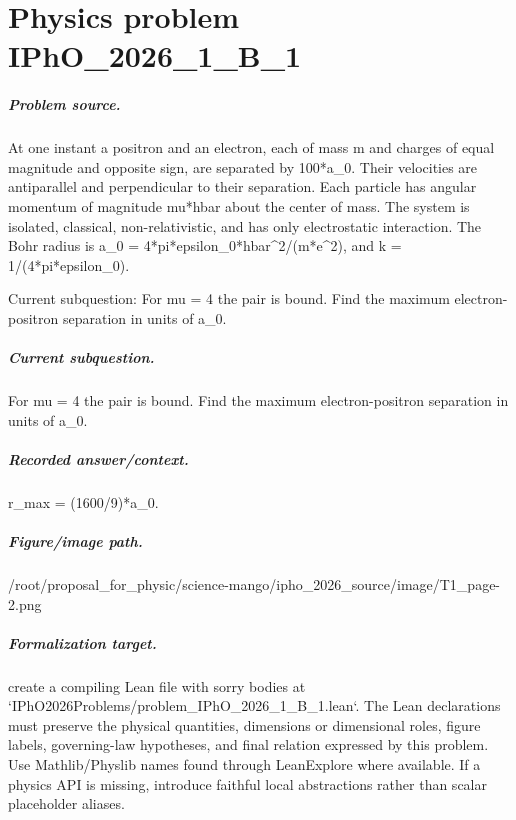 
\chapter{Physics problem IPhO\_2026\_1\_B\_1}
\label{ch:IPhO2026Problems_problem_IPhO_2026_1_B_1}

\paragraph{Problem source.}
At one instant a positron and an electron, each of mass m and charges of equal
magnitude and opposite sign, are separated by 100*a\_0.  Their velocities are
antiparallel and perpendicular to their separation.  Each particle has angular
momentum of magnitude mu*hbar about the center of mass.  The system is isolated,
classical, non-relativistic, and has only electrostatic interaction.  The Bohr
radius is a\_0 = 4*pi*epsilon\_0*hbar\textasciicircum{}2/(m*e\textasciicircum{}2), and k = 1/(4*pi*epsilon\_0).

Current subquestion:
For mu = 4 the pair is bound. Find the maximum electron-positron separation in units of a\_0.

\paragraph{Current subquestion.}
For mu = 4 the pair is bound. Find the maximum electron-positron separation in units of a\_0.

\paragraph{Recorded answer/context.}
r\_max = (1600/9)*a\_0.

\paragraph{Figure/image path.}
/root/proposal\_for\_physic/science-mango/ipho\_2026\_source/image/T1\_page-2.png

\paragraph{Formalization target.}
create a compiling Lean file with sorry bodies at `IPhO2026Problems/problem\_IPhO\_2026\_1\_B\_1.lean`. The Lean declarations must preserve the physical quantities, dimensions or dimensional roles, figure labels, governing-law hypotheses, and final relation expressed by this problem.
Use Mathlib/Physlib names found through LeanExplore where available. If a physics API is missing, introduce faithful local abstractions rather than scalar placeholder aliases.

